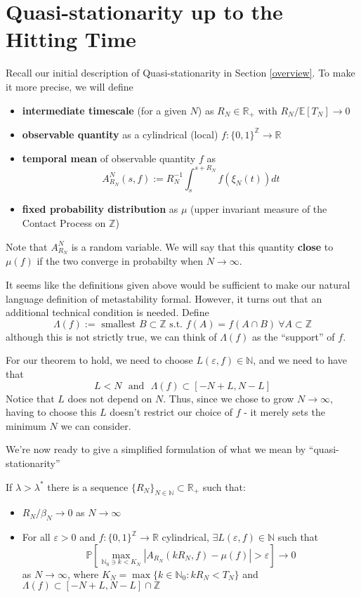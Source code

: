 \documentclass{scrartcl}
\begin{document}
\section{Quasi-stationarity up to the Hitting Time}

Recall our initial description of Quasi-stationarity in Section \ref{overview}. To make it more precise, we will define 
\begin{itemize}
    \item \textbf{intermediate timescale} (for a given $N$) as $R_N \in \mathbb{R}_+$ with $R_N/\mathbb{E}[T_N] \rightarrow 0$
    \item \textbf{observable quantity} as a cylindrical (local) $f:\{0,1\}^\mathbb{Z} \rightarrow \mathbb{R}$
    \item \textbf{temporal mean} of observable quantity $f$ as
    \[
        A^N_{R_N}(s, f) := R_N^{-1}\int_s^{s+R_N}f(\xi_N(t))dt
    \]
    \item \textbf{fixed probability distribution} as $\mu$ (upper invariant measure of the Contact Process on $\mathbb{Z}$)
\end{itemize}
Note that $A^N_{R_N}$ is a random variable. We will say that this quantity \textbf{close} to $\mu(f)$ if the two converge in probabilty when $N \rightarrow \infty$.

It seems like the definitions given above would be sufficient to make our natural language definition of metastability formal. However, it turns out that an additional technical 
condition is needed. Define
    \[
        \Lambda(f) :=  \text{ smallest } B\subset \mathbb{Z} \text{ s.t. } f(A) = f(A\cap B) \ \forall A \subset \mathbb{Z}
    \]
    although this is not strictly true, we can think of $\Lambda(f)$ as the ``support'' of $f$.  

For our theorem to hold, we need to choose $L(\varepsilon, f) \in \mathbb{N}$, and we need to have that
\[
    L < N \text{~~and~~} \Lambda(f) \subset [-N+L, N-L]
\]
Notice that $L$ does not depend on $N$. Thus, since we chose to grow $N \rightarrow \infty$, having to choose this $L$ doesn't restrict our choice of $f$ - it merely sets the minimum
 $N$ we can consider.

 We're now ready to give a simplified formulation of what we mean by ``quasi-stationarity''
    \begin{theorem}
        If $\lambda > \lambda^*$ there is a sequence $\{R_N\}_{N \in \mathbb{N}} \subset \mathbb{R_+}$ such that:
        \begin{itemize}
            \item $R_N/\beta_N \rightarrow 0$ as $N\rightarrow \infty$
            \item For all $\varepsilon > 0$ and $f:\{0,1\}^\mathbb{Z} \rightarrow \mathbb{R}$ cylindrical,  $\exists L(\varepsilon, f) \in \mathbb{N}$ such that
                  \[
                      \mathbb{P}\left[ \max_{\mathbb{N}_0 \ni k < K_N}|A_{R_N}(kR_N, f) - \mu(f)| > \varepsilon\right] \rightarrow 0
                  \]
                  as $N \rightarrow \infty$, where $K_N = \max\{k \in \mathbb{N}_0: kR_N < T_N\}$ and $\Lambda(f) \subset [-N + L, N - L] \cap \mathbb{Z}$
        \end{itemize}
    \end{theorem}
\end{document}
